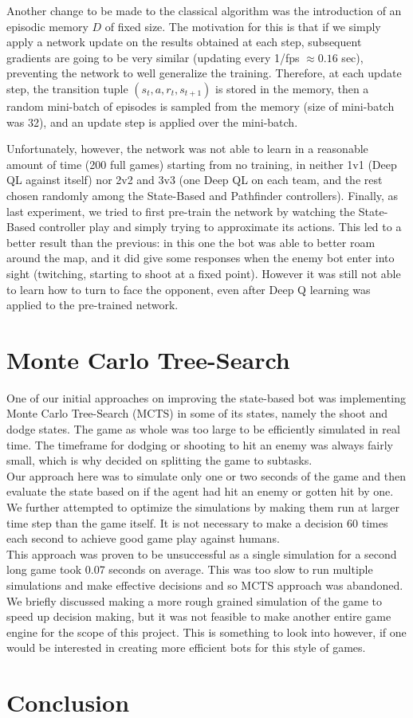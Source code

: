 \documentclass{article}
\begin{document}
	Another change to be made to the classical algorithm was the introduction of an episodic memory $D$ of fixed size. The motivation for this is that if we simply apply a network update on the results obtained at each step, subsequent gradients are going to be very similar (updating every 1/fps $\approx 0.16$ sec), preventing the network to well generalize the training. Therefore, at each update step, the transition tuple $(s_t,a,r_t,s_{t+1})$ is stored in the memory, then a random mini-batch of episodes is sampled from the memory (size of mini-batch was 32), and an update step is applied over the mini-batch.
	
	Unfortunately, however, the network was not able to learn in a reasonable amount of time (200 full games) starting from no training, in neither 1v1 (Deep QL against itself) nor 2v2 and 3v3 (one Deep QL on each team, and the rest chosen randomly among the State-Based and Pathfinder controllers). Finally, as last experiment, we tried to first pre-train the network by watching the State-Based controller play and simply trying to approximate its actions. This led to a better result than the previous: in this one the bot was able to better roam around the map, and it did give some responses when the enemy bot enter into sight (twitching, starting to shoot at a fixed point). However it was still not able to learn how to turn to face the opponent, even after Deep Q learning was applied to the pre-trained network.
	
	
	\section{Monte Carlo Tree-Search}
	One of our initial approaches on improving the state-based bot was implementing Monte Carlo Tree-Search (MCTS) in some of its states, namely the shoot and dodge states. The game as whole was too large to be efficiently simulated in real time. The timeframe for dodging or shooting to hit an enemy was always fairly small, which is why decided on splitting the game to subtasks. \\
	Our approach here was to simulate only one or two seconds of the game and then evaluate the state based on if the agent had hit an enemy or gotten hit by one. We further attempted to optimize the simulations by making them run at larger time step than the game itself. It is not necessary to make a decision 60 times each second to achieve good game play against humans. \\
	This approach was proven to be unsuccessful as a single simulation for a second long game took 0.07 seconds on average. This was too slow to run multiple simulations and make effective decisions and so MCTS approach was abandoned. \\
	We briefly discussed making a more rough grained simulation of the game to speed up decision making, but it was not feasible to make another entire game engine for the scope of this project. This is something to look into however, if one would be interested in creating more efficient bots for this style of games.
	
	
	\section{Conclusion}
	
	
	
\end{document}
